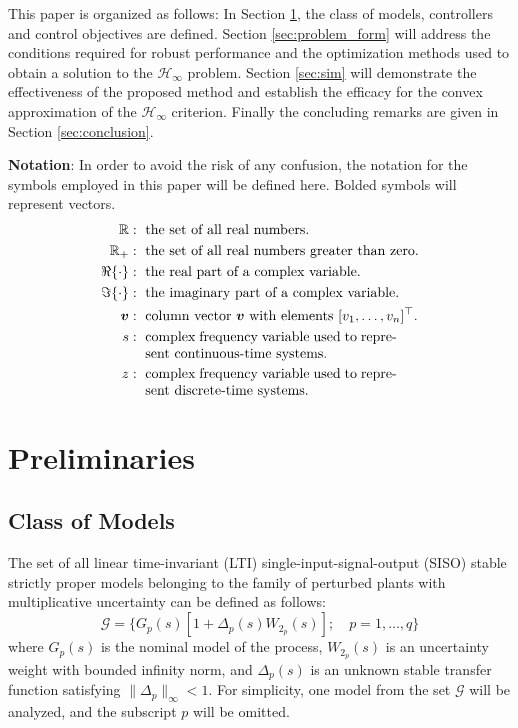 \documentclass[letterpaper, 10 pt, conference]{ieeeconf}  %
\begin{document}
This paper is organized as follows: In Section \ref{sec:pre}, the class of models, controllers and control objectives are defined. Section \ref{sec:problem_form} will address the conditions required for robust performance and the optimization methods used to obtain a solution to the $\mathcal{H}_{\infty}$ problem. Section \ref{sec:sim} will demonstrate the effectiveness of the proposed method and establish the efficacy for the convex approximation of the $\mathcal{H}_{\infty}$ criterion. Finally the concluding remarks are given in Section \ref{sec:conclusion}.

\textbf{Notation}: In order to avoid the risk of any confusion, the notation for the symbols employed in this paper will be defined here. Bolded symbols will represent vectors.
\begin{align*}
\mathbb{R} &: \ \mbox{the set of all real numbers.} \\
\mathbb{R}_+ &: \ \mbox{the set of all real numbers greater than zero.} \\
\Re\{\cdot \} &: \ \mbox{the real part of a complex variable.} \\
\Im\{\cdot \} &: \ \mbox{the imaginary part of a complex variable.} \\
\bm{v} &: \ \mbox{column vector }\bm{v} \mbox{ with elements }[v_1,\ldots,v_n]^{\top}. \\
s &: \ \parbox[t]{18em}{complex frequency variable used to represent continuous-time systems.} \\
z &: \ \parbox[t]{18em}{complex frequency variable used to represent discrete-time systems.}
\end{align*} 

\section{Preliminaries} \label{sec:pre}
\subsection{Class of Models}
The set of all linear time-invariant (LTI) single-input-signal-output (SISO) stable strictly proper models belonging to the family of perturbed plants with multiplicative uncertainty can be defined as follows:
\begin{equation}\label{eq:uncert_set}
\mathcal{G} = \{ G_p(s)[1+\Delta_p(s) W_{2_{p}}(s)]; \quad p=1,\ldots,q\}
\end{equation}  
where $G_p(s)$ is the nominal model of the process, $W_{2_{p}}(s)$ is an uncertainty weight with bounded infinity norm, and $\Delta_p(s)$ is an unknown stable transfer function satisfying $\| \Delta_p \|_{\infty}<1$. For simplicity, one model from the set $\mathcal{G}$ will be analyzed, and the subscript $p$ will be omitted. 
\end{document}
